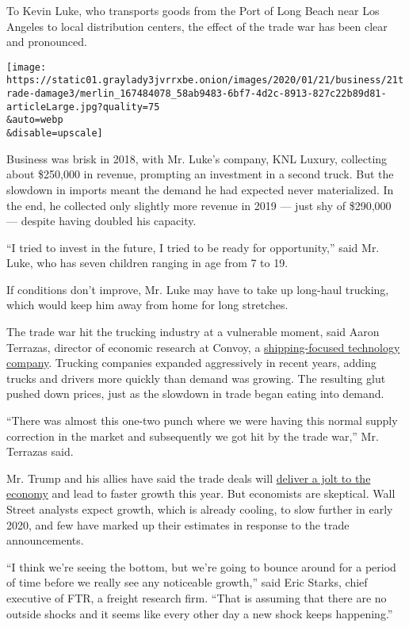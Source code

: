 To Kevin Luke, who transports goods from the Port of Long Beach near Los
Angeles to local distribution centers, the effect of the trade war has
been clear and pronounced.

\texttt{[image: https://static01.graylady3jvrrxbe.onion/images/2020/01/21/business/21trade-damage3/merlin\_167484078\_58ab9483-6bf7-4d2c-8913-827c22b89d81-articleLarge.jpg?quality=75\\\&auto=webp\\\&disable=upscale]}

Business was brisk in 2018, with Mr. Luke's company, KNL Luxury,
collecting about \$250,000 in revenue, prompting an investment in a
second truck. But the slowdown in imports meant the demand he had
expected never materialized. In the end, he collected only slightly more
revenue in 2019 --- just shy of \$290,000 --- despite having doubled his
capacity.

``I tried to invest in the future, I tried to be ready for
opportunity,'' said Mr. Luke, who has seven children ranging in age from
7 to 19.

If conditions don't improve, Mr. Luke may have to take up long-haul
trucking, which would keep him away from home for long stretches.

The trade war hit the trucking industry at a vulnerable moment, said
Aaron Terrazas, director of economic research at Convoy, a
\href{https://www.nytimes3xbfgragh.onion/2019/08/29/automobiles/trucking-apps-shipping.html}{shipping-focused
technology company}. Trucking companies expanded aggressively in recent
years, adding trucks and drivers more quickly than demand was growing.
The resulting glut pushed down prices, just as the slowdown in trade
began eating into demand.

``There was almost this one-two punch where we were having this normal
supply correction in the market and subsequently we got hit by the trade
war,'' Mr. Terrazas said.

Mr. Trump and his allies have said the trade deals will
\href{https://www.nytimes3xbfgragh.onion/2020/01/16/business/trade-deals-economy.html}{deliver
a jolt to the economy} and lead to faster growth this year. But
economists are skeptical. Wall Street analysts expect growth, which is
already cooling, to slow further in early 2020, and few have marked up
their estimates in response to the trade announcements.

``I think we're seeing the bottom, but we're going to bounce around for
a period of time before we really see any noticeable growth,'' said Eric
Starks, chief executive of FTR, a freight research firm. ``That is
assuming that there are no outside shocks and it seems like every other
day a new shock keeps happening.''


